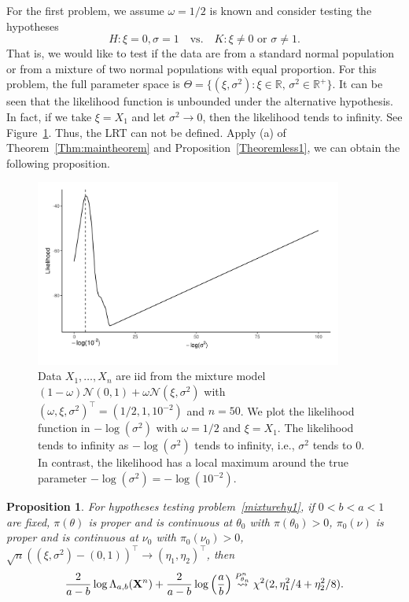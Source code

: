 \documentclass[11pt]{article}
\newcommand{\myT}{\intercal}
\theoremstyle{plain}
\newtheorem{proposition}{\quad\quad Proposition}
\theoremstyle{definition}
\theoremstyle{remark}
\begin{document}
For the first problem, we assume $\omega=1/2$ is known and consider testing the hypotheses
\begin{equation}
    H: \xi=0,\sigma=1\quad \text{vs.} \quad K: \xi\neq 0 \text{ or } \sigma \neq 1.
    \label{mixturehy1}
\end{equation}
That is, we would like to test if the data are from a standard normal population or from a mixture of two normal populations with equal proportion.
For this problem, the full parameter space is $\Theta = \{(\xi, \sigma^2): \xi \in \mathbb R, \, \sigma^2 \in \mathbb R^+ \}$.
It can be seen that the likelihood function is unbounded under the alternative hypothesis.
In fact, if we take $\xi=X_1$ and let $\sigma^2\to 0$, then the likelihood tends to infinity.
See Figure~\ref{myFigure1}.
Thus, the LRT can not be defined.
Apply (a) of Theorem~\ref{Thm:maintheorem} and Proposition~\ref{Theoremless1}, we can obtain the following proposition.
\begin{figure}
    \begin{center}
        \includegraphics[width=0.9\textwidth]{figure/newnewPP}
    \end{center}
    \caption{
        Data $X_1,\ldots,X_n$ are iid from the mixture model $(1-\omega)\mathcal{N}(0,1)+\omega\mathcal{N}(\xi,\sigma^2)$ with $(\omega,\xi,\sigma^2)^\myT =(1/2,1,10^{-2})$ and $n=50$.
        We plot the likelihood function  in $-\log (\sigma^2)$ with $\omega=1/2$ and $\xi=X_1$.
        The likelihood tends to infinity as $-\log (\sigma^2)$ tends to infinity, i.e., $\sigma^2$ tends to $0$.
        In contrast, the likelihood has a local maximum around the true parameter $-\log (\sigma^{2})=-\log (10^{-2})$.
    }
    \label{myFigure1}
\end{figure}
\begin{proposition}
For hypotheses testing problem~\eqref{mixturehy1}, 
if $0< b < a <1$ are fixed, $\pi(\theta)$ is proper and is continuous at $\theta_0$ with $\pi(\theta_0) > 0$, $\pi_0 (\nu)$ is proper and is continuous at $\nu_0$ with $\pi_0 (\nu_0) > 0 $, $\sqrt{n}((\xi,\sigma^2)-(0,1))^\myT \to (\eta_1,\eta_2)^\myT  $, then
\begin{equation*}
    \frac{2}{a-b}\log \Lambda_{a,b} (\mathbf{X}^n)
    +\frac{2}{a-b}\log \left(\frac{a}{b}\right)
    \overset{P^n_{\theta_n}}{\rightsquigarrow}
    \chi^2(2,\eta_1^2/4+\eta_2^2/8).
\end{equation*}
    \label{propositionTT}
\end{proposition}
\end{document}
